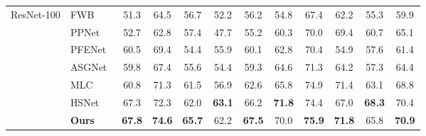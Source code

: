 \documentclass[runningheads]{llncs}
\begin{document}
\begin{table}[htb]
{\begin{tabular}{l|l|ccccc|ccccc}
    
    \hline \midrule
    \multirow{7}{*}{ResNet-100} 
    
    & FWB~\cite{FWB}
    &51.3&64.5&56.7&52.2&56.2&54.8&67.4&62.2&55.3&59.9\\     
    
    & PPNet~\cite{PPNet} 
    &52.7&62.8&57.4&47.7&55.2&60.3&70.0&69.4&60.7&65.1\\
    
    & PFENet~\cite{PFENet}
    &60.5&69.4&54.4&55.9&60.1&62.8&70.4&54.9&57.6&61.4\\
    
    & ASGNet~\cite{ASGNet}
    &59.8&67.4&55.6&54.4&59.3&64.6&71.3&64.2&57.3&64.4\\

    & MLC~\cite{MLC} &60.8&71.3&61.5&56.9&62.6&65.8&74.9&71.4&63.1&68.8\\

    & HSNet~\cite{HSNet}
    &67.3&72.3&62.0&\textbf{63.1}&66.2&\textbf{71.8}&74.4&67.0&\textbf{68.3}&70.4\\

    & \textbf{Ours} &\textbf{67.8}&\textbf{74.6}&\textbf{65.7}&62.2&\textbf{67.5}&70.0&\textbf{75.9}&\textbf{71.8}&65.8&\textbf{70.9}\\

    \bottomrule
    
  \end{tabular}
  }
\end{table}
\end{document}
